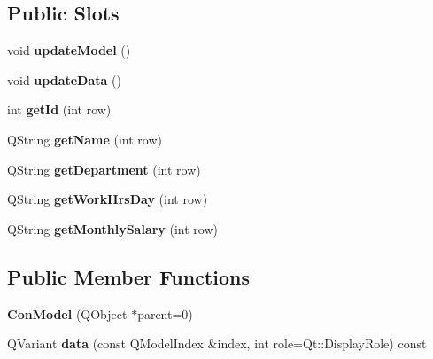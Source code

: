 \subsection*{Public Slots}
\begin{DoxyCompactItemize}
\item 
\mbox{\label{class_con_model_a6ee8067e3ac42b99c0bb4969a3b68a3f}} 
void {\bfseries update\+Model} ()
\item 
\mbox{\label{class_con_model_aa1490599f379abb6f838e1ac18841293}} 
void {\bfseries update\+Data} ()
\item 
\mbox{\label{class_con_model_a7825b4bc4bfdcdd0404f9186b1413f6e}} 
int {\bfseries get\+Id} (int row)
\item 
\mbox{\label{class_con_model_aa126b22b4b25e28a2115a8b19c233f4a}} 
Q\+String {\bfseries get\+Name} (int row)
\item 
\mbox{\label{class_con_model_af39cb5e003655e73f392f4eba3af79b9}} 
Q\+String {\bfseries get\+Department} (int row)
\item 
\mbox{\label{class_con_model_a01dcfaacf11f32348f479367282fc832}} 
Q\+String {\bfseries get\+Work\+Hrs\+Day} (int row)
\item 
\mbox{\label{class_con_model_ac124e2a925ed61f670b5965b63d1e3ae}} 
Q\+String {\bfseries get\+Monthly\+Salary} (int row)
\end{DoxyCompactItemize}
\subsection*{Public Member Functions}
\begin{DoxyCompactItemize}
\item 
\mbox{\label{class_con_model_a9c45f9fcdc6b8cdd61f214dbd8bb5c0a}} 
{\bfseries Con\+Model} (Q\+Object $\ast$parent=0)
\item 
\mbox{\label{class_con_model_a1aee4378113c58fa0d3906b3a1b93b9d}} 
Q\+Variant {\bfseries data} (const Q\+Model\+Index \&index, int role=Qt\+::\+Display\+Role) const
\end{DoxyCompactItemize}
